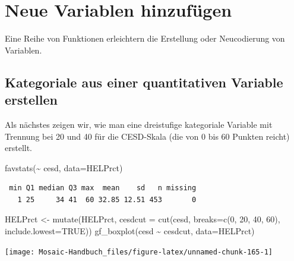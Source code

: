\documentclass[
  ngerman,
]{scrbook}
\newenvironment{Shaded}{\begin{snugshade}}{\end{snugshade}}
\newcommand{\AttributeTok}[1]{\textcolor[rgb]{0.77,0.63,0.00}{#1}}
\newcommand{\ConstantTok}[1]{\textcolor[rgb]{0.00,0.00,0.00}{#1}}
\newcommand{\DecValTok}[1]{\textcolor[rgb]{0.00,0.00,0.81}{#1}}
\newcommand{\FunctionTok}[1]{\textcolor[rgb]{0.00,0.00,0.00}{#1}}
\newcommand{\NormalTok}[1]{#1}
\newcommand{\OtherTok}[1]{\textcolor[rgb]{0.56,0.35,0.01}{#1}}
\newcommand{\SpecialCharTok}[1]{\textcolor[rgb]{0.00,0.00,0.00}{#1}}
\begin{document}
\hypertarget{neue-variablen-hinzufuxfcgen}{%
\section{Neue Variablen hinzufügen}\label{neue-variablen-hinzufuxfcgen}}

Eine Reihe von Funktionen erleichtern die Erstellung oder Neucodierung von Variablen.

\hypertarget{kategoriale-aus-einer-quantitativen-variable-erstellen}{%
\subsection{Kategoriale aus einer quantitativen Variable erstellen}\label{kategoriale-aus-einer-quantitativen-variable-erstellen}}

Als nächstes zeigen wir, wie man eine dreistufige kategoriale Variable mit Trennung bei 20 und 40 für die CESD-Skala (die von 0 bis 60 Punkten reicht) erstellt.

\begin{Shaded}
\begin{Highlighting}[]
\FunctionTok{favstats}\NormalTok{(}\SpecialCharTok{\textasciitilde{}}\NormalTok{ cesd, }\AttributeTok{data=}\NormalTok{HELPrct)}
\end{Highlighting}
\end{Shaded}

\begin{verbatim}
 min Q1 median Q3 max  mean    sd   n missing
   1 25     34 41  60 32.85 12.51 453       0
\end{verbatim}

\begin{Shaded}
\begin{Highlighting}[]
\NormalTok{HELPrct }\OtherTok{\textless{}{-}} \FunctionTok{mutate}\NormalTok{(HELPrct, }
                  \AttributeTok{cesdcut =} \FunctionTok{cut}\NormalTok{(cesd, }
                                \AttributeTok{breaks=}\FunctionTok{c}\NormalTok{(}\DecValTok{0}\NormalTok{, }\DecValTok{20}\NormalTok{, }\DecValTok{40}\NormalTok{, }\DecValTok{60}\NormalTok{), }
                                \AttributeTok{include.lowest=}\ConstantTok{TRUE}\NormalTok{))}
\FunctionTok{gf\_boxplot}\NormalTok{(cesd }\SpecialCharTok{\textasciitilde{}}\NormalTok{ cesdcut, }\AttributeTok{data=}\NormalTok{HELPrct)}
\end{Highlighting}
\end{Shaded}

\begin{center}\texttt{[image: Mosaic-Handbuch\_files/figure-latex/unnamed-chunk-165-1]} \end{center}
\end{document}
